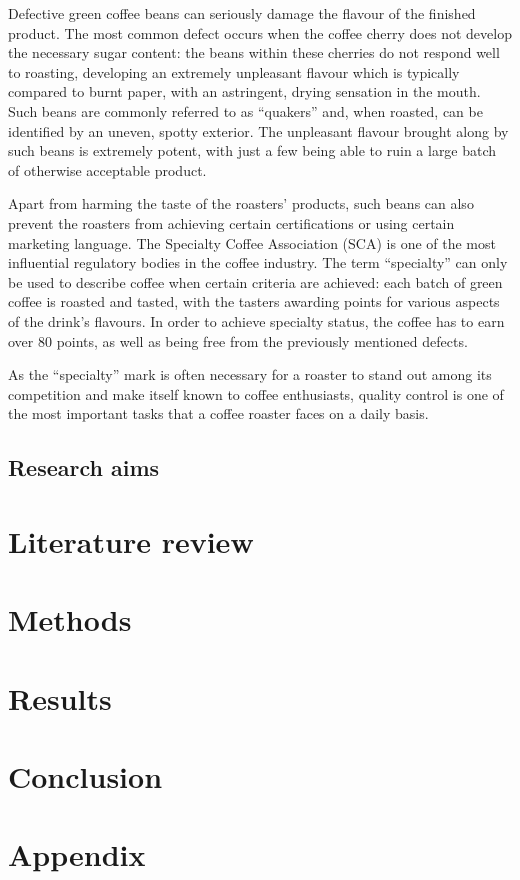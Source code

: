 \documentclass{./styles/UoYCSproject}
\begin{document}
Defective green coffee beans can seriously damage the flavour of the finished product.
The most common defect occurs when the coffee cherry does not develop the necessary sugar content:
the beans within these cherries do not respond well to roasting, developing an extremely unpleasant flavour
which is typically compared to burnt paper, with an astringent, drying sensation in the mouth.
Such beans are commonly referred to as ``quakers'' and, when roasted, can be identified by an uneven, spotty exterior.
The unpleasant flavour brought along by such beans is extremely potent, with just a few being able to ruin a large batch
of otherwise acceptable product.

Apart from harming the taste of the roasters' products, such beans can also prevent the roasters from achieving certain
certifications or using certain marketing language.
The Specialty Coffee Association (SCA) is one of the most influential regulatory bodies in the coffee industry.
The term ``specialty'' can only be used to describe coffee when certain criteria are achieved:
each batch of green coffee is roasted and tasted, with the tasters awarding points for various aspects of the drink's flavours.
In order to achieve specialty status, the coffee has to earn over 80 points, as well as being free from the previously mentioned defects.

As the ``specialty'' mark is often necessary for a roaster to stand out among its competition and make itself known to
coffee enthusiasts, quality control is one of the most important tasks that a coffee roaster faces on a daily basis.


\section{Research aims}
\label{sec:research-aims}



\chapter{Literature review}
\label{ch:litreview}


\chapter{Methods}
\label{ch:methods}

\chapter{Results}
\label{ch:results}

\chapter{Conclusion}
\label{ch:conclusion}


\appendix
\chapter{Appendix}
\label{ch:appendix}

\printbibliography
\end{document}
